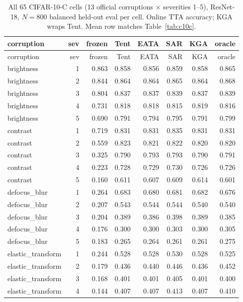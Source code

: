 {\footnotesize
\begin{longtable}{lrrrrrrr}
\caption{All 65 CIFAR-10-C cells (13 official corruptions $\times$ severities 1--5), ResNet-18, $N{=}800$ balanced held-out eval per cell. Online TTA accuracy; \textsc{KGA} wraps Tent. Mean row matches Table~\ref{tab:c10c}.}\label{tab:c10c-full}\\
\toprule
corruption & sev & frozen & Tent & EATA & SAR & KGA & oracle \\
\midrule
\endfirsthead
\toprule
corruption & sev & frozen & Tent & EATA & SAR & KGA & oracle \\
\midrule
\endhead
brightness & 1 & 0.863 & 0.858 & 0.856 & 0.859 & 0.858 & 0.865 \\
brightness & 2 & 0.844 & 0.864 & 0.864 & 0.865 & 0.864 & 0.868 \\
brightness & 3 & 0.804 & 0.837 & 0.837 & 0.839 & 0.837 & 0.839 \\
brightness & 4 & 0.731 & 0.818 & 0.818 & 0.815 & 0.819 & 0.816 \\
brightness & 5 & 0.690 & 0.791 & 0.794 & 0.795 & 0.791 & 0.799 \\
contrast & 1 & 0.719 & 0.831 & 0.831 & 0.835 & 0.831 & 0.831 \\
contrast & 2 & 0.559 & 0.823 & 0.821 & 0.822 & 0.820 & 0.820 \\
contrast & 3 & 0.325 & 0.790 & 0.793 & 0.793 & 0.790 & 0.791 \\
contrast & 4 & 0.223 & 0.728 & 0.729 & 0.730 & 0.726 & 0.726 \\
contrast & 5 & 0.160 & 0.611 & 0.607 & 0.609 & 0.614 & 0.601 \\
defocus\_blur & 1 & 0.264 & 0.683 & 0.680 & 0.681 & 0.682 & 0.676 \\
defocus\_blur & 2 & 0.207 & 0.543 & 0.544 & 0.544 & 0.540 & 0.540 \\
defocus\_blur & 3 & 0.204 & 0.389 & 0.386 & 0.398 & 0.389 & 0.385 \\
defocus\_blur & 4 & 0.176 & 0.300 & 0.300 & 0.303 & 0.300 & 0.305 \\
defocus\_blur & 5 & 0.183 & 0.265 & 0.264 & 0.261 & 0.261 & 0.275 \\
elastic\_transform & 1 & 0.244 & 0.528 & 0.528 & 0.530 & 0.528 & 0.525 \\
elastic\_transform & 2 & 0.179 & 0.436 & 0.440 & 0.446 & 0.436 & 0.452 \\
elastic\_transform & 3 & 0.168 & 0.401 & 0.401 & 0.405 & 0.401 & 0.400 \\
elastic\_transform & 4 & 0.144 & 0.407 & 0.407 & 0.413 & 0.407 & 0.410 \\

\end{longtable}}
